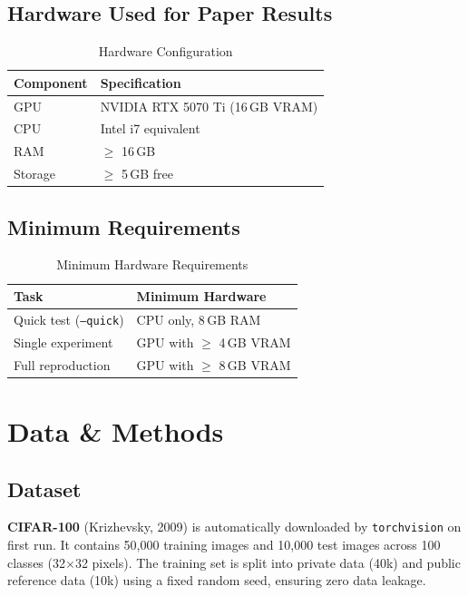 \documentclass[conference]{IEEEtran}
\begin{document}
\subsection{Hardware Used for Paper Results}

\begin{table}[h]
\centering
\caption{Hardware Configuration}
\label{tab:hw}
\begin{tabular}{@{}ll@{}}
\toprule
Component & Specification \\
\midrule
GPU     & NVIDIA RTX 5070 Ti (16\,GB VRAM) \\
CPU     & Intel i7 equivalent \\
RAM     & $\geq$ 16\,GB \\
Storage & $\geq$ 5\,GB free \\
\bottomrule
\end{tabular}
\end{table}

\subsection{Minimum Requirements}

\begin{table}[h]
\centering
\caption{Minimum Hardware Requirements}
\label{tab:minreq}
\begin{tabular}{@{}ll@{}}
\toprule
Task & Minimum Hardware \\
\midrule
Quick test (\texttt{--quick}) & CPU only, 8\,GB RAM \\
Single experiment             & GPU with $\geq$ 4\,GB VRAM \\
Full reproduction             & GPU with $\geq$ 8\,GB VRAM \\
\bottomrule
\end{tabular}
\end{table}

\section{Data \& Methods}

\subsection{Dataset}

\textbf{CIFAR-100} (Krizhevsky, 2009) is automatically downloaded by \texttt{torchvision} on first run.
It contains 50{,}000 training images and 10{,}000 test images across 100 classes (32$\times$32 pixels).
The training set is split into private data (40k) and public reference data (10k) using a fixed random seed, ensuring zero data leakage.
\end{document}
